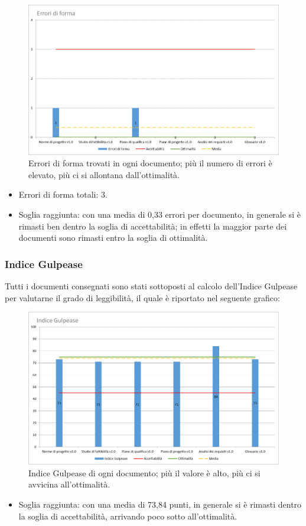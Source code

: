 \begin{figure}[h!]
	\centering
	\includegraphics[scale=0.6]{img/Grafici/Errori_forma.png}
	\caption{Errori di forma trovati in ogni documento; più il numero di errori è elevato, più ci si allontana dall'ottimalità.}
	\label{fig:Errori_forma}
\end{figure}

\begin{itemize}
	\item Errori di forma totali: 3.
	\item Soglia raggiunta: con una media di 0,33 errori per documento, in generale si è rimasti ben dentro la soglia di accettabilità; in effetti la maggior parte dei documenti sono rimasti entro la soglia di ottimalità.
\end{itemize}

\newpage

\subsubsection{Indice Gulpease}

Tutti i documenti consegnati sono stati sottoposti al calcolo dell'Indice Gulpease per valutarne il grado di leggibilità, il quale è riportato nel seguente grafico:

\begin{figure}[h!]
	\centering
	\includegraphics[scale=0.6]{img/Grafici/Gulpease.png}
	\caption{Indice Gulpease di ogni documento; più il valore è alto, più ci si avvicina all'ottimalità.}
	\label{fig:Gulpease}
\end{figure}

\begin{itemize}
	\item Soglia raggiunta: con una media di 73,84 punti, in generale si è rimasti dentro la soglia di accettabilità, arrivando poco sotto all'ottimalità.
\end{itemize}

